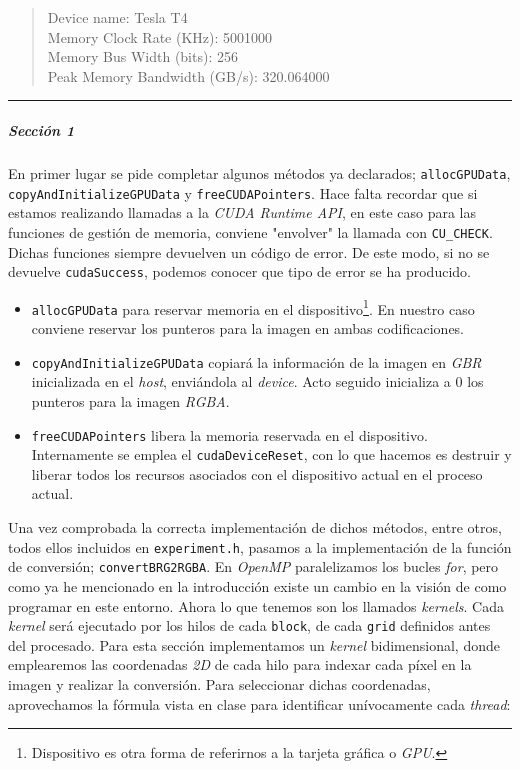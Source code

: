 \documentclass[
]{article}
\begin{document}
\begin{quote}
Device name: Tesla T4\\
Memory Clock Rate (KHz): 5001000\\
Memory Bus Width (bits): 256\\
Peak Memory Bandwidth (GB/s): 320.064000
\end{quote}

\begin{center}\rule{0.5\linewidth}{0.5pt}\end{center}

\hypertarget{secciuxf3n-1}{%
\subparagraph{Sección 1}\label{secciuxf3n-1}}

En primer lugar se pide completar algunos métodos ya declarados;
\texttt{allocGPUData}, \texttt{copyAndInitializeGPUData} y
\texttt{freeCUDAPointers}. Hace falta recordar que si estamos realizando
llamadas a la \emph{CUDA Runtime API}, en este caso para las funciones
de gestión de memoria, conviene "envolver" la llamada con
\texttt{CU\_CHECK}. Dichas funciones siempre devuelven un código de
error. De este modo, si no se devuelve \texttt{cudaSuccess}, podemos
conocer que tipo de error se ha producido.

\begin{itemize}
\item
  \texttt{allocGPUData} para reservar memoria en el
  dispositivo\footnote{Dispositivo es otra forma de referirnos a la
    tarjeta gráfica o \emph{GPU}.}. En nuestro caso conviene reservar
  los punteros para la imagen en ambas codificaciones.
\item
  \texttt{copyAndInitializeGPUData} copiará la información de la imagen
  en \emph{GBR} inicializada en el \emph{host}, enviándola al
  \emph{device}. Acto seguido inicializa a 0 los punteros para la imagen
  \emph{RGBA}.
\item
  \texttt{freeCUDAPointers} libera la memoria reservada en el
  dispositivo. Internamente se emplea el \texttt{cudaDeviceReset}, con
  lo que hacemos es destruir y liberar todos los recursos asociados con
  el dispositivo actual en el proceso actual.
\end{itemize}

Una vez comprobada la correcta implementación de dichos métodos, entre
otros, todos ellos incluidos en \texttt{experiment.h}, pasamos a la
implementación de la función de conversión; \texttt{convertBRG2RGBA}. En
\emph{OpenMP} paralelizamos los bucles \emph{for}, pero como ya he
mencionado en la introducción existe un cambio en la visión de como
programar en este entorno. Ahora lo que tenemos son los llamados
\emph{kernels}. Cada \emph{kernel} será ejecutado por los hilos de cada
\texttt{block}, de cada \texttt{grid} definidos antes del procesado.
Para esta sección implementamos un \emph{kernel} bidimensional, donde
emplearemos las coordenadas \emph{2D} de cada hilo para indexar cada
píxel en la imagen y realizar la conversión. Para seleccionar dichas
coordenadas, aprovechamos la fórmula vista en clase para identificar
unívocamente cada \emph{thread}:
\end{document}
